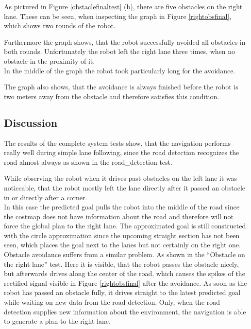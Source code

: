 As pictured in Figure \ref{obstaclefinaltest} (b), there are five obstacles on the right lane. These can be seen, when inspecting the graph in Figure \ref{rightobsfinal}, which shows two rounds of the robot.

Furthermore the graph shows, that the robot successfully avoided all obstacles in both rounds. Unfortunately the robot left the right lane three times, when no obstacle in the proximity of it.\\

In the middle of the graph the robot took particularly long for the avoidance.

The graph also shows, that the avoidance is always finished before the robot is two meters away from the obstacle and therefore satisfies this condition.

\subsection{Discussion}

The results of the complete system tests show, that the navigation performs really well during simple lane following, since the road detection recognizes the road almost always as shown in the road\_detection test.

While observing the robot when it drives past obstacles on the left lane it was noticeable, that the robot mostly left the lane directly after it passed an obstacle in or directly after a corner.\\ 
In this case the predicted goal pulls the robot into the middle of the road since the costmap does not have information about the road and therefore will not force the global plan to the right lane. The approximated goal is still constructed with the circle approximation since the upcoming straight section has not been seen, which places the goal next to the lanes but not certainly on the right one.\\

Obstacle avoidance suffers from a similar problem. As shown in the ``Obstacle on the right lane'' test. Here it is visible, that the robot passes the obstacle nicely, but afterwards drives along the center of the road, which causes the spikes of the rectified signal visible in Figure \ref{rightobsfinal} after the avoidance. As soon as the robot has passed an obstacle fully, it drives straight to the latest predicted goal while waiting on new data from the road detection. Only, when the road detection supplies new information about the environment, the navigation is able to generate a plan to the right lane.




